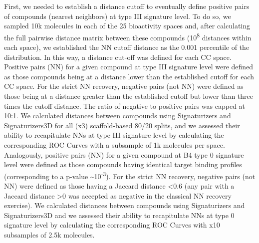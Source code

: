 First, we needed to establish a distance cutoff to eventually define positive pairs of compounds (nearest neighbors) at type III signature level. To do so, we sampled 10k molecules in each of the 25 bioactivity spaces and, after calculating the full pairwise distance matrix between these compounds (10\textsuperscript{8} distances within each space), we established the NN cutoff distance as the 0.001 percentile of the distribution. In this way, a distance cut-off was defined for each CC space. 
Positive pairs (NN) for a given compound at type III signature level were defined as those compounds being at a distance lower than the established cutoff for each CC space. For the strict NN recovery, negative pairs (not NN) were defined as those being at a distance greater than the established cutoff but lower than three times the cutoff distance. The ratio of negative to positive pairs was capped at 10:1. We calculated distances between compounds using Signaturizers and Signaturizers3D for all (x3) scaffold-based 80/20 splits, and we assessed their ability to recapitulate NNs at type III signature level by calculating the corresponding ROC Curves with a subsample of 1k molecules per space. Analogously, positive pairs (NN) for a given compound at B4 type 0 signature level were defined as those compounds having identical target binding profiles (corresponding to a p-value \textasciitilde10\textsuperscript{-3}). For the strict NN recovery, negative pairs (not NN) were defined as those having a Jaccard distance <0.6 (any pair with a Jaccard distance >0 was accepted as negative in the classical NN recovery exercise). We calculated distances between compounds using Signaturizers and Signaturizers3D and we assessed their ability to recapitulate NNs at type 0 signature level by calculating the corresponding ROC Curves with x10 subsamples of 2.5k molecules.